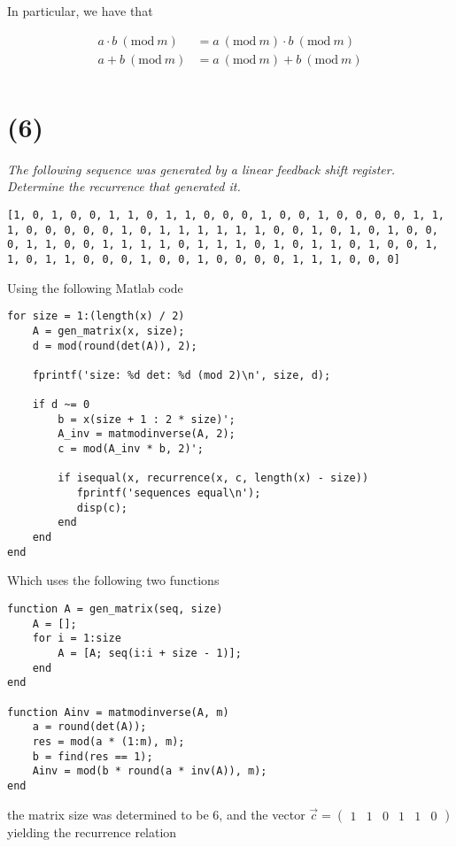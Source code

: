 \documentclass[12pt]{article}
\renewcommand{\mod}[1]{\mathrm{mod}\ #1}
\renewcommand{\pmod}[1]{\ (\mod{#1})}
\begin{document}
In particular, we have that

\begin{align*}
    a \cdot b \pmod{m} &= a \pmod{m} \cdot b \pmod{m}\\
    a + b \pmod{m} &= a \pmod{m} + b \pmod{m}\\
\end{align*}

\section*{(6)} \textit{The following sequence was generated by a linear feedback shift register. Determine the recurrence that generated it.}

\texttt{[1, 0, 1, 0, 0, 1, 1, 0, 1, 1, 0, 0, 0, 1, 0, 0, 1, 0, 0, 0, 0, 1, 1,
1, 0, 0, 0, 0, 0, 1, 0, 1, 1, 1, 1, 1, 1, 0, 0, 1, 0, 1, 0, 1, 0, 0,
0, 1, 1, 0, 0, 1, 1, 1, 1, 0, 1, 1, 1, 0, 1, 0, 1, 1, 0, 1, 0, 0, 1,
1, 0, 1, 1, 0, 0, 0, 1, 0, 0, 1, 0, 0, 0, 0, 1, 1, 1, 0, 0, 0]}

Using the following Matlab code

\begin{verbatim}
for size = 1:(length(x) / 2)
    A = gen_matrix(x, size);
    d = mod(round(det(A)), 2);

    fprintf('size: %d det: %d (mod 2)\n', size, d);

    if d ~= 0
        b = x(size + 1 : 2 * size)';
        A_inv = matmodinverse(A, 2);
        c = mod(A_inv * b, 2)';

        if isequal(x, recurrence(x, c, length(x) - size))
           fprintf('sequences equal\n');
           disp(c);
        end
    end
end
\end{verbatim}

Which uses the following two functions

\begin{verbatim}
function A = gen_matrix(seq, size)
    A = [];
    for i = 1:size
        A = [A; seq(i:i + size - 1)];
    end
end

function Ainv = matmodinverse(A, m)
    a = round(det(A));
    res = mod(a * (1:m), m);
    b = find(res == 1);
    Ainv = mod(b * round(a * inv(A)), m);
end
\end{verbatim}

the matrix size was determined to be $6$, and the vector $\vec{c} = \begin{pmatrix}1 & 1 & 0 & 1 & 1 & 0\end{pmatrix}$ yielding the recurrence relation
\end{document}

